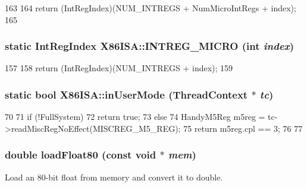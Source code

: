 \begin{DoxyCode}
163     {
164         return (IntRegIndex)(NUM_INTREGS + NumMicroIntRegs + index);
165     }
\end{DoxyCode}
\hypertarget{namespaceX86ISA_a8bb7e419ce07ff5a21dd4fc4a9f62dad}{
\subsubsection[{INTREG\_\-MICRO}]{\setlength{\rightskip}{0pt plus 5cm}static IntRegIndex X86ISA::INTREG\_\-MICRO (int {\em index})}}
\label{namespaceX86ISA_a8bb7e419ce07ff5a21dd4fc4a9f62dad}



\begin{DoxyCode}
157     {
158         return (IntRegIndex)(NUM_INTREGS + index);
159     }
\end{DoxyCode}
\hypertarget{namespaceX86ISA_a59cc15503fa0b85477b179e132bb6a5a}{
\subsubsection[{inUserMode}]{\setlength{\rightskip}{0pt plus 5cm}static bool X86ISA::inUserMode ({\bf ThreadContext} $\ast$ {\em tc})}}
\label{namespaceX86ISA_a59cc15503fa0b85477b179e132bb6a5a}



\begin{DoxyCode}
70     {
71         if (!FullSystem) {
72             return true;
73         } else {
74             HandyM5Reg m5reg = tc->readMiscRegNoEffect(MISCREG_M5_REG);
75             return m5reg.cpl == 3;
76         }
77     }
\end{DoxyCode}
\hypertarget{namespaceX86ISA_a97c5f8f8ac0ded173ac00bfae8e92e0e}{
\subsubsection[{loadFloat80}]{\setlength{\rightskip}{0pt plus 5cm}double loadFloat80 (const void $\ast$ {\em mem})}}
\label{namespaceX86ISA_a97c5f8f8ac0ded173ac00bfae8e92e0e}
Load an 80-\/bit float from memory and convert it to double.


